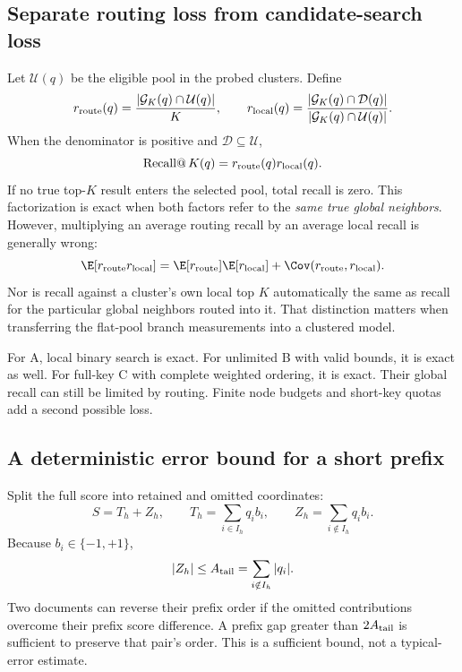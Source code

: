 \subsection{Separate routing loss from candidate-search loss}
Let $\mathcal U(q)$ be the eligible pool in the probed clusters. Define
\[
r_{\rm route}(q)=\frac{|\mathcal G_K(q)\cap\mathcal U(q)|}{K},\qquad
r_{\rm local}(q)=\frac{|\mathcal G_K(q)\cap\mathcal D(q)|}
 {|\mathcal G_K(q)\cap\mathcal U(q)|}.
\]
When the denominator is positive and $\mathcal D\subseteq\mathcal U$,
\begin{equation}
\operatorname{Recall@}K(q)=r_{\rm route}(q)r_{\rm local}(q).
\label{eq:recall-stages}
\end{equation}
If no true top-$K$ result enters the selected pool, total recall is zero. This factorization is
exact when both factors refer to the \emph{same true global neighbors}. However, multiplying
an average routing recall by an average local recall is generally wrong:
\[
\E[r_{\rm route}r_{\rm local}]
=\E[r_{\rm route}]\E[r_{\rm local}]+\Cov(r_{\rm route},r_{\rm local}).
\]
Nor is recall against a cluster's own local top $K$ automatically the same as recall for the
particular global neighbors routed into it. That distinction matters when transferring the
flat-pool branch measurements into a clustered model.

For A, local binary search is exact. For unlimited B with valid bounds, it is exact as well.
For full-key C with complete weighted ordering, it is exact. Their global recall can still
be limited by routing. Finite node budgets and short-key quotas add a second possible loss.

\subsection{A deterministic error bound for a short prefix}
Split the full score into retained and omitted coordinates:
\begin{equation}
S=T_h+Z_h,\qquad T_h=\sum_{i\in I_h}q_i b_i,\qquad
Z_h=\sum_{i\notin I_h}q_i b_i.
\end{equation}
Because $b_i\in\{-1,+1\}$,
\begin{equation}
|Z_h|\leq A_{\rm tail}=\sum_{i\notin I_h}|q_i|.
\label{eq:tail-error}
\end{equation}
Two documents can reverse their prefix order if the omitted contributions overcome their
prefix score difference. A prefix gap greater than $2A_{\rm tail}$ is sufficient to preserve
that pair's order. This is a sufficient bound, not a typical-error estimate.

